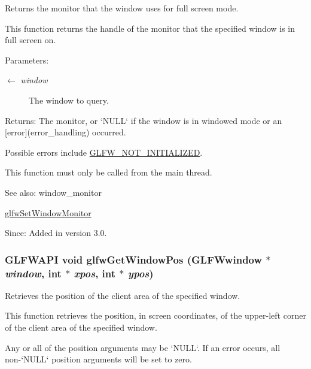 Returns the monitor that the window uses for full screen mode. 

This function returns the handle of the monitor that the specified window is in full screen on.

\begin{Desc}
\item[Parameters:]
\begin{description}
\item[\mbox{$\leftarrow$} {\em window}]The window to query. \end{description}
\end{Desc}
\begin{Desc}
\item[Returns:]The monitor, or `NULL` if the window is in windowed mode or an \mbox{[}error\mbox{]}(error\_\-handling) occurred.\end{Desc}
Possible errors include \hyperlink{group__errors_g2374ee02c177f12e1fa76ff3ed15e14a}{GLFW\_\-NOT\_\-INITIALIZED}.

This function must only be called from the main thread.

\begin{Desc}
\item[See also:]window\_\-monitor 

\hyperlink{group__window_g12fabf78575e59c00f822f323ae0b6ae}{glfwSetWindowMonitor}\end{Desc}
\begin{Desc}
\item[Since:]Added in version 3.0. \end{Desc}
\hypertarget{group__window_g0076a8591ef7494d359730cf2250b45b}{
\subsubsection[glfwGetWindowPos]{\setlength{\rightskip}{0pt plus 5cm}GLFWAPI void glfwGetWindowPos ({\bf GLFWwindow} $\ast$ {\em window}, \/  int $\ast$ {\em xpos}, \/  int $\ast$ {\em ypos})}}
\label{group__window_g0076a8591ef7494d359730cf2250b45b}


Retrieves the position of the client area of the specified window. 

This function retrieves the position, in screen coordinates, of the upper-left corner of the client area of the specified window.

Any or all of the position arguments may be `NULL`. If an error occurs, all non-`NULL` position arguments will be set to zero.


